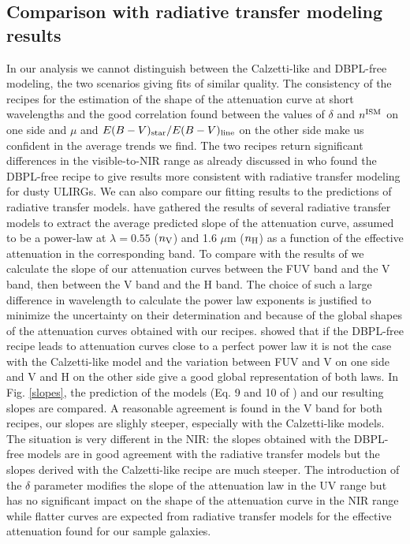 \documentclass{aa}
\begin{document}
\subsection{Comparison with  radiative transfer modeling results}
In our analysis  we cannot  distinguish between the Calzetti-like and  DBPL-free modeling, the two scenarios giving fits of similar quality. The consistency of  the  recipes for the estimation of the shape of the attenuation curve at short wavelengths and the good correlation found between the  values of $\delta$ and $n^{\rm ISM}$ on one side and $\mu$ and $E(B-V)_{\rm star}/E(B-V)_{\rm line}$ on the other side   make us confident in  the average trends we find. The two recipes return significant differences in the visible-to-NIR  range as already discussed in \citet{LoFaro17} who found   the DBPL-free recipe to give results more consistent with radiative transfer modeling for dusty ULIRGs. We can also  compare our fitting results  to the predictions of radiative transfer models. \citet{Chevallard13} have gathered the results of several radiative transfer models  to extract the average predicted slope of the attenuation curve, assumed to be a power-law at $\lambda= 0.55$ ($n_{\rm V}$) and 1.6 $\mu$m ($n_{\rm H}$) as a function of the effective attenuation in the corresponding band. To compare with the results of \citet{Chevallard13} we calculate the slope of our  attenuation curves  between the FUV band and the V band, then between the V band and the H band. The choice of such a large difference in wavelength to calculate the power law exponents is justified to minimize the uncertainty on their determination and because of  the global shapes of the attenuation curves obtained with our recipes.   \citet{LoFaro17}  showed that if the DBPL-free recipe leads to attenuation curves close to a perfect power law it is not the case with the Calzetti-like model and the variation between FUV and V on one side and V and H on the other side give a good global representation of  both laws. In Fig. \ref{slopes}, the prediction of the models (Eq. 9 and 10 of \citet{Chevallard13}) and our resulting slopes are compared. A reasonable  agreement is found in the V band for both recipes, our slopes are slighly steeper, especially with the Calzetti-like models. The situation is very different in the NIR: the slopes obtained with the DBPL-free models are in good agreement with the radiative transfer models but the slopes  derived  with the Calzetti-like recipe are much steeper. The introduction of the $\delta$ parameter modifies the slope of the attenuation law in the UV range but  has no significant impact on the shape of the attenuation curve in the NIR range  while  flatter curves  are  expected from radiative transfer models for the effective attenuation found for our sample galaxies. 
\end{document}
